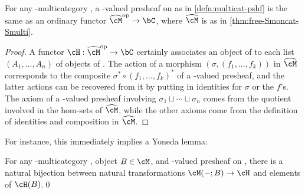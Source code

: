 \begin{thm}\label{thm:multicat-pshf-catctx}
  For any \fS-multicategory \cM, a \bC-valued presheaf on \cM as in \cref{defn:multicat-pshf} is the same as an ordinary functor $\catctx\cM\op \to \bC$, where $\catctx\cM$ is as in \cref{thm:free-Smoncat-Smulti}.
\end{thm}
\begin{proof}
  A functor $\cH:\catctx\cM\op \to \bC$ certainly associates an object of \bC to each list $(A_1,\dots,A_n)$ of objects of \cM.
  The action of a morphism $(\sigma,(f_1,\dots,f_k))$ in $\catctx\cM$ corresponds to the composite $\sigma^*\circ (f_1,\dots,f_k)^*$ of a \bC-valued presheaf, and the latter actions can be recovered from it by putting in identities for $\sigma$ or the $f$'s.
  The axiom of a \bC-valued presheaf involving $\sigma_1\sqcup\cdots\sqcup\sigma_n$ comes from the quotient involved in the hom-sets of $\catctx\cM$, while the other axioms come from the definition of identities and composition in $\catctx\cM$.
\end{proof}

For instance, this immediately implies a Yoneda lemma:

\begin{cor}\label{thm:multicat-yoneda}
  For any \fS-multicategory \cM, object $B\in\cM$, and \bSet-valued presheaf \cH on \cM, there is a natural bijection between natural transformations $\cM(-;B) \to \cH$ and elements of $\cH(B)$.\qed
\end{cor}

